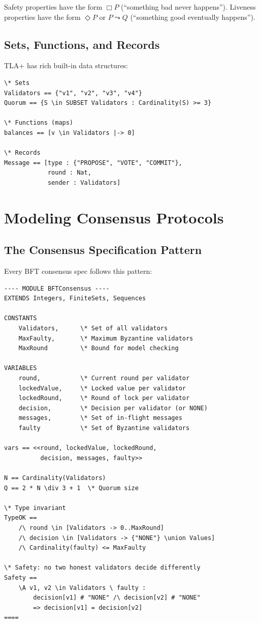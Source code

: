 \documentclass[11pt,a4paper]{article}
\begin{document}
Safety properties have the form $\Box P$ (``something bad never happens'').
Liveness properties have the form $\Diamond P$ or $P \leadsto Q$ (``something good
eventually happens'').

\subsection{Sets, Functions, and Records}

TLA+ has rich built-in data structures:

\begin{lstlisting}[language=TLA,caption={TLA+ data structures}]
\* Sets
Validators == {"v1", "v2", "v3", "v4"}
Quorum == {S \in SUBSET Validators : Cardinality(S) >= 3}

\* Functions (maps)
balances == [v \in Validators |-> 0]

\* Records
Message == [type : {"PROPOSE", "VOTE", "COMMIT"},
            round : Nat,
            sender : Validators]
\end{lstlisting}

\section{Modeling Consensus Protocols}

\subsection{The Consensus Specification Pattern}

Every BFT consensus spec follows this pattern:

\begin{lstlisting}[language=TLA,caption={BFT consensus specification pattern}]
---- MODULE BFTConsensus ----
EXTENDS Integers, FiniteSets, Sequences

CONSTANTS
    Validators,      \* Set of all validators
    MaxFaulty,       \* Maximum Byzantine validators
    MaxRound         \* Bound for model checking

VARIABLES
    round,           \* Current round per validator
    lockedValue,     \* Locked value per validator
    lockedRound,     \* Round of lock per validator
    decision,        \* Decision per validator (or NONE)
    messages,        \* Set of in-flight messages
    faulty           \* Set of Byzantine validators

vars == <<round, lockedValue, lockedRound,
          decision, messages, faulty>>

N == Cardinality(Validators)
Q == 2 * N \div 3 + 1  \* Quorum size

\* Type invariant
TypeOK ==
    /\ round \in [Validators -> 0..MaxRound]
    /\ decision \in [Validators -> {"NONE"} \union Values]
    /\ Cardinality(faulty) <= MaxFaulty

\* Safety: no two honest validators decide differently
Safety ==
    \A v1, v2 \in Validators \ faulty :
        decision[v1] # "NONE" /\ decision[v2] # "NONE"
        => decision[v1] = decision[v2]
====
\end{lstlisting}
\end{document}
